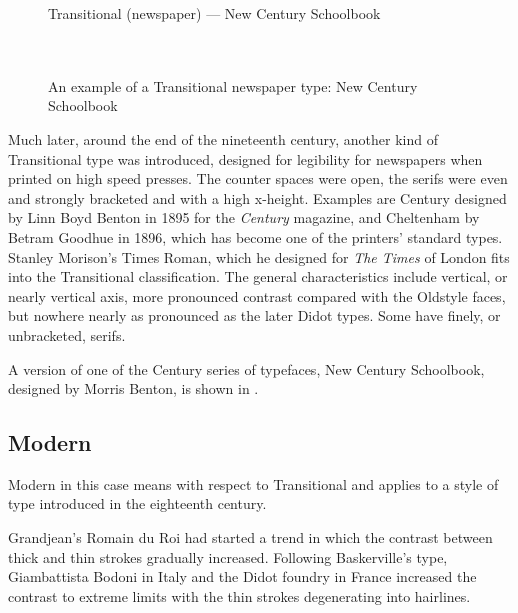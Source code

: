 \documentclass[10pt,a4paper,oneside,extrafontsizes]{memoir}%
\begin{document}
\begin{figure}
\centering
{\centering{}\selectfont
  Transitional (newspaper) --- New Century Schoolbook \\
  \UCalphabet \\
  \LCalphabet \\
  \fox\par}
\caption{An example of a Transitional newspaper type: New Century Schoolbook} 
   \label{fig:newcent}
\end{figure}

\begin{paracol}{2}
\switchEng
    Much later, around the end of the nineteenth century, another kind of 
Transitional type was introduced, designed for legibility for newspapers 
when printed on high speed presses. The counter spaces were open, the 
serifs were even and strongly bracketed and with a high x-height.
Examples are Century designed by 
 Linn Boyd Benton in 1895 for the \emph{Century}
magazine, and 
Cheltenham by Betram Goodhue 
in 1896, which has become one of the printers' standard types. Stanley
Morison's Times Roman, 
which he
designed for \emph{The Times} of London fits into the Transitional
classification. The general characteristics include vertical, or nearly
vertical axis, more pronounced contrast compared with the Oldstyle faces, but
nowhere nearly as pronounced as the later Didot types. Some have finely, or
unbracketed, serifs.

    A version of one of the Century 
series of typefaces, 
New Century Schoolbook, designed
by Morris Benton,
is shown in .
\end{paracol}

\subsection{Modern}


\begin{paracol}{2}
\switchEng
    Modern in this case means with respect to Transitional 
and applies to a style of type introduced in the eighteenth century.

    Grandjean's Romain du Roi had started a trend 
in which the contrast 
between thick and thin strokes gradually increased. Following Baskerville's
type, Giambattista Bodoni in Italy and the 
Didot foundry in France increased the contrast 
to extreme limits with the thin strokes degenerating into hairlines.
\end{paracol}
\end{document}
